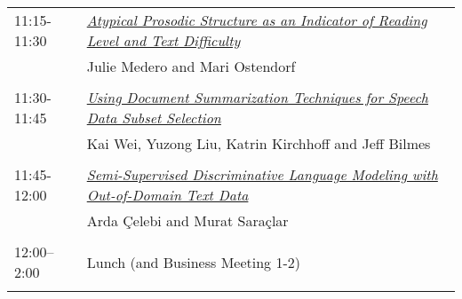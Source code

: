 \begin{tabular}{p{20mm}p{138mm}}
11:15-11:30 & \hyperlink{page.715}{\em Atypical Prosodic Structure as an Indicator of Reading Level and Text Difficulty}\\
         & Julie Medero and Mari Ostendorf \\
\\

11:30-11:45 & \hyperlink{page.721}{\em Using Document Summarization Techniques for Speech Data Subset Selection}\\
         & Kai Wei, Yuzong Liu, Katrin Kirchhoff and Jeff Bilmes \\
\\

11:45-12:00 & \hyperlink{page.727}{\em Semi-Supervised Discriminative Language Modeling with Out-of-Domain Text Data}\\
         & Arda \c{C}elebi and Murat Sara\c{c}lar \\
\\

12:00--2:00 & Lunch (and Business Meeting 1-2)
 \\
\\
\end{tabular}
\newpage
